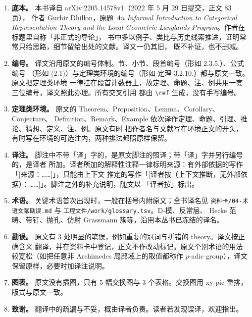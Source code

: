 \documentclass[UTF8, a4paper, 12pt, fontset=fandol, scheme=chinese]{ctexart}
\begin{document}
\begin{enumerate}
\item \textbf{底本。} 本书译自 arXiv:2205.14578v1（2022 年 5 月 29 日提交，正文 83 页），
  作者 Gurbir Dhillon，原题 \emph{An Informal Introduction to Categorical Representation
  Theory and the Local Geometric Langlands Program}。作者在标题里自称「非正式的导论」，
  书中多以例子、类比与历史线索推进，证明常常只给思路，细节留给出处的文献。译文一仍其旧，
  既不补证，也不删减。

\item \textbf{编号。} 译文沿用原文的编号体制。节、小节、段首编号（形如 2.3.5.）、公式编号
  （形如 (2.1)）与定理类环境的编号（形如 定理 3.2.10.）都与原文一致。原文把定理类环境
  一律挂在段首计数器上，故定理、命题、注、例共用一套三位编号，译文照此办理。所有交叉引用
  都由 \verb|\ref| 生成，没有手写编号。

\item \textbf{定理类环境。} 原文的 Theorem、Proposition、Lemma、Corollary、Conjecture、
  Definition、Remark、Example 依次译作定理、命题、引理、推论、猜想、定义、注、例。原文有时
  把作者名与文献写在环境正文的开头，有时写在环境的可选注内，两种排法都照原样保留。

\item \textbf{译注。} 脚注中不带「译」字的，是原文脚注的照译；带「译」字并另行编号的，是译者
  所加。译者所加的解释性注释一律标明来源：有外部依据的写作「[来源：……]」，只能由上下文
  推定的写作「[译者按（上下文推断，无外部依据）：……]」。脚注之外的补充说明，随文以
  「译者按」标出。

\item \textbf{术语。} 关键术语首次出现时，一般在括号内附原文；全书译名见
  \texttt{资料卡/04-术语文献勘误.md} 与 \texttt{工程文件/work/glossary.tsv}。D-模、反常层、
  Hecke 范畴、带钉、抛孔、仿射 Grassmann 簇等，沿用本丛书已冻结的译名。

\item \textbf{勘误。} 原文有 3 处明显的笔误，例如重复的冠词与拼错的 theory。译文按正确含义
  翻译，并在资料卡中登记，正文不作改动标记。原文个别术语的用法较宽松（如把任意非
  Archimedes 局部域上的取值都称作 $p$-adic group），译文保留原样，必要时加译注说明。

\item \textbf{图表。} 原文没有插图，只有 5 幅交换图与 3 个表格。交换图用 xy-pic 重排，
  版式与原文一致。

\item \textbf{致谢。} 翻译中的疏漏与不妥，概由译者负责。读者若发现误译，欢迎指出。
\end{enumerate}
\end{document}
